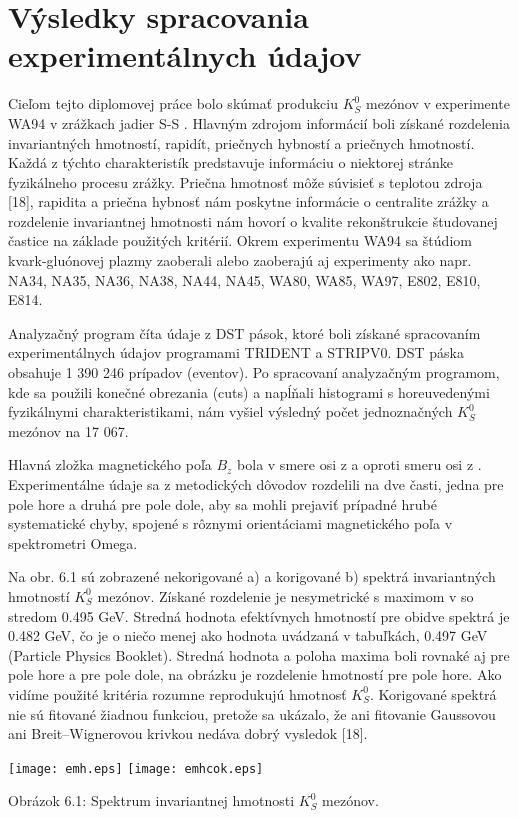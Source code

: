 
%

\chapter{Výsledky spracovania experimentálnych údajov}
Cieľom tejto diplomovej práce bolo skúmať produkciu $K^{0}_{S}$ mezónov v
experimente WA94 v zrážkach jadier S-S . Hlavným zdrojom
informácií boli získané  rozdelenia  invariantných hmotností, rapidít,
priečnych hybností a priečnych hmotností. Každá z týchto charakteristík
predstavuje informáciu o niektorej stránke fyzikálneho procesu zrážky.
Priečna hmotnosť môže súvisieť s teplotou zdroja [18], rapidita a priečna
hybnosť nám poskytne informácie o centralite zrážky a rozdelenie invariantnej
hmotnosti nám hovorí o kvalite rekonštrukcie študovanej častice na základe
použitých kritérií. Okrem  experimentu WA94 sa štúdiom kvark-gluónovej plazmy
zaoberali alebo zaoberajú aj experimenty ako napr. NA34, NA35, NA36, NA38,
NA44, NA45, WA80, WA85, WA97, E802, E810, E814.

Analyzačný program číta údaje z  DST pások, ktoré boli získané
spracovaním experimentálnych údajov programami TRIDENT a STRIPV0.
DST páska obsahuje  1 390 246 prípadov (eventov).
Po spracovaní analyzačným programom, kde sa použili konečné obrezania
(cuts) a napĺňali histogrami s horeuvedenými fyzikálnymi charakteristikami,
nám vyšiel výsledný počet  jednoznačných  $K^{0}_{S}$ mezónov na 17 067.

Hlavná zložka magnetického poľa $B_{z}$ bola v smere osi z  a
oproti smeru osi z . Experimentálne údaje sa z metodických
dôvodov rozdelili na dve časti, jedna pre pole hore a druhá pre
pole  dole, aby sa mohli prejaviť prípadné  hrubé systematické chyby,
spojené s rôznymi orientáciami magnetického poľa v spektrometri Omega.

Na obr. 6.1 sú zobrazené nekorigované a) a korigované b) spektrá
invariantných  hmotností $K^{0}_{S}$ mezónov. Získané rozdelenie je
nesymetrické s maximom v  so stredom 0.495 GeV. Stredná hodnota
efektívnych hmotností pre obidve spektrá je 0.482 GeV, čo je o niečo menej
ako hodnota uvádzaná v tabuľkách, 0.497 GeV (Particle Physics Booklet).
Stredná hodnota a poloha maxima boli rovnaké aj pre pole hore a pre pole
dole, na obrázku je rozdelenie hmotností pre pole hore. Ako vidíme použité
kritéria rozumne reprodukujú hmotnosť $K^{0}_{S}$. Korigované spektrá nie sú
fitované žiadnou funkciou, pretože sa ukázalo, že ani fitovanie Gaussovou ani
Breit--Wignerovou krivkou nedáva dobrý vysledok [18].
\begin{center}
  \texttt{[image: emh.eps]}
  \texttt{[image: emhcok.eps]}
\end{center}
\begin{center}
  Obrázok 6.1: Spektrum invariantnej hmotnosti $K^{0}_{S}$ mezónov.
\end{center}


